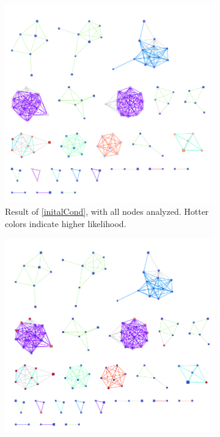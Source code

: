 \documentclass[10pt]{article}
\theoremstyle{definition}
\numberwithin{theorem}{section}
\numberwithin{definition}{section}
\numberwithin{lemma}{section}
\numberwithin{corollary}{section}
\numberwithin{clm}{section}
\numberwithin{rmk}{section}
\begin{document}
\begin{figure}
	\begin{center}
	\begin{subfigure}[b]{0.48\linewidth}
	\begin{center}
\includegraphics[scale = 0.3]{ranked_ivp.png}	
\end{center}
\caption{Result of \cref{initalCond}, with all nodes analyzed. Hotter colors indicate higher likelihood.}
\end{subfigure}
\begin{subfigure}[b]{0.48\linewidth}
		\begin{center}
		\includegraphics[scale = 0.3]{ranked_bdvp.png}	

\end{center}
\end{subfigure}
\end{center}
\end{figure}
\end{document}
